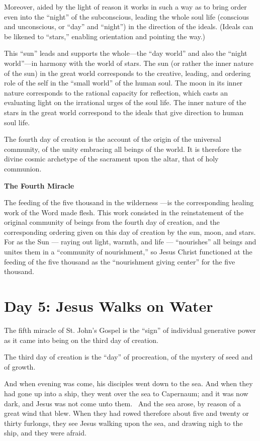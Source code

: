 Moreover, aided by the light of reason it works in such a way as to bring order even into the ``night'' of the subconscious, leading the whole soul life (conscious and unconscious, or ``day'' and ``night'') in the direction of the ideals. (Ideals can be likened to ``stars,'' enabling orientation and pointing the way.)

This ``sun'' leads and supports the whole—the ``day world'' and also the ``night world''—in harmony with the world of stars. The sun (or rather the inner nature of the sun) in the great world corresponds to the creative, leading, and ordering role of the self in the ``small world'' of the human soul. The moon in its inner nature corresponds to the rational capacity for reflection, which casts an evaluating light on the irrational urges of the soul life. The inner nature of the stars in the great world correspond to the ideals that give direction to human soul life.

The fourth day of creation is the account of the origin of the universal community, of the unity embracing all beings of the world. It is therefore the divine cosmic archetype of the sacrament upon the altar, that of holy communion.

\textbf{The Fourth Miracle}

The feeding of the five thousand in the wilderness —is the corresponding healing work of the Word made flesh. This work consisted in the reinstatement of the original community of beings from the fourth day of creation, and the corresponding ordering given on this day of creation by the sun, moon, and stars. For as the Sun — raying out light, warmth, and life — ``nourishes'' all beings and unites them in a ``community of nourishment,'' so Jesus Christ functioned at the feeding of the five thousand as the ``nourishment giving center'' for the five thousand.

\section{Day 5: Jesus Walks on Water}

The fifth miracle of St. John's Gospel is the ``sign'' of individual generative power as it came into being on the third day of creation.

The third day of creation is the ``day'' of procreation, of the mystery of seed and of growth.

And when evening was come, his disciples went down to the sea. And when they had gone up into a ship, they went over the sea to Capernaum; and it was now dark, and Jesus was not come unto them.  And the sea arose, by reason of a great wind that blew. When they had rowed therefore about five and twenty or thirty furlongs, they see Jesus walking upon the sea, and drawing nigh to the ship, and they were afraid.

